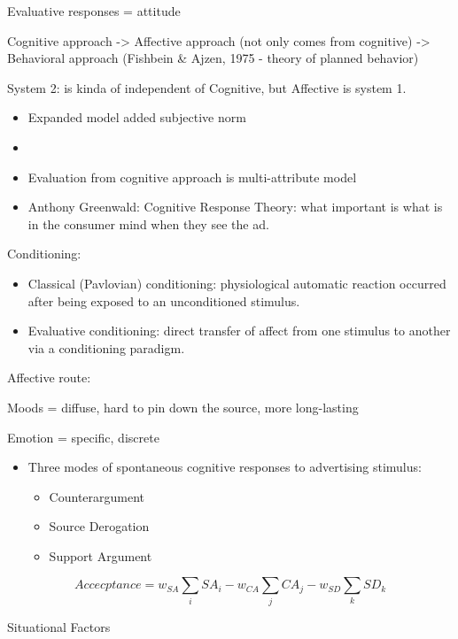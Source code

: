 \documentclass[
]{book}
\begin{document}
Evaluative responses = attitude

Cognitive approach -\textgreater{} Affective approach (not only comes from cognitive) -\textgreater{} Behavioral approach (Fishbein \& Ajzen, 1975 - theory of planned behavior)

System 2: is kinda of independent of Cognitive, but Affective is system 1.

\begin{itemize}
\item
  Expanded model added subjective norm
\item
  \citet{zajonc1980}
\item
  Evaluation from cognitive approach is multi-attribute model
\item
  Anthony Greenwald: Cognitive Response Theory: what important is what is in the consumer mind when they see the ad.
\end{itemize}

Conditioning:

\begin{itemize}
\item
  Classical (Pavlovian) conditioning: physiological automatic reaction occurred after being exposed to an unconditioned stimulus.
\item
  Evaluative conditioning: direct transfer of affect from one stimulus to another via a conditioning paradigm.
\end{itemize}

Affective route:

Moods = diffuse, hard to pin down the source, more long-lasting

Emotion = specific, discrete

\citep{wright1973}

\begin{itemize}
\item
  Three modes of spontaneous cognitive responses to advertising stimulus:

  \begin{itemize}
  \item
    Counterargument
  \item
    Source Derogation
  \item
    Support Argument
  \end{itemize}
\end{itemize}

\[
Accecptance = w_{SA} \sum_{i} SA_i - w_{CA} \sum_j CA_j - w_{SD} \sum_k SD_k
\]

Situational Factors
\end{document}
